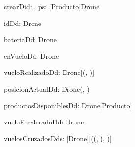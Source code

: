 \begin{problema}{crearD}{id: \ent, ps: [Producto]}{Drone}
\end{problema}

\begin{problema}{idD}{d: Drone}{\ent}
\end{problema}

\begin{problema}{bateriaD}{d: Drone}{\ent}
\end{problema}

\begin{problema}{enVueloD}{d: Drone}{\bool}
\end{problema}

\begin{problema}{vueloRealizadoD}{d: Drone}{[(\ent, \ent)]}
\end{problema}

\begin{problema}{posicionActualD}{d: Drone}{(\ent, \ent)}
\end{problema}

\begin{problema}{productosDisponiblesD}{d: Drone}{[Producto]}
\end{problema}

\begin{problema}{vueloEscaleradoD}{d: Drone}{\bool}
\end{problema}

\begin{problema}{vuelosCruzadosD}{ds: [Drone]}{[((\ent, \ent), \ent)]}
\end{problema}
